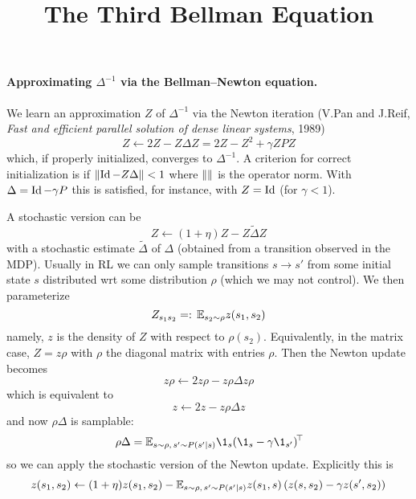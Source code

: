 \documentclass[11pt,a4paper]{article}
\title{The Third Bellman Equation}
\author{}
\begin{document}
\maketitle

\paragraph{Approximating $\Delta^{-1}$ via the Bellman--Newton equation.}
We learn an approximation $Z$ of $\Delta^{-1}$ via the Newton iteration
(V.Pan and J.Reif, \emph{Fast and efficient parallel solution of dense
linear systems}, 1989)
\begin{equation}
Z\gets 2Z-Z\Delta Z=2Z-Z^2+\gamma ZPZ
\end{equation}
which, if properly initialized, converges to $\Delta^{-1}$. A criterion
for correct initialization is if $\left\lVert\operatorname{Id}-Z\Delta\right\rVert<1$ where $\left\lVert\right\rVert$
is the operator norm. With $\Delta=\operatorname{Id}-\gamma P$ this is satisfied, for
instance, with $Z=\operatorname{Id}$ (for $\gamma<1$).

A stochastic version can be
\begin{equation}
Z\gets (1+\eta) Z-Z\tilde \Delta Z
\end{equation}
with a stochastic estimate $\tilde \Delta$ of $\Delta$ (obtained from a
transition observed in the MDP). Usually in RL we can only sample
transitions $s\to s'$ from some initial state $s$ distributed wrt some
distribution $\rho$ (which we may not control). We then parameterize
\begin{equation}
Z_{s_1s_2}=\mathrel{\mathop{:}} \,\mathbb{E}_{s_2\sim \rho} z(s_1,s_2)
\end{equation}
namely, $z$ is the density of $Z$ with respect to $\rho(s_2)$.
Equivalently, in the matrix case, $Z=z\rho$ with $\rho$ the diagonal
matrix with entries $\rho$. Then the Newton update becomes
\begin{equation}
z\rho\gets 2z\rho-z\rho\Delta z\rho
\end{equation}
which is equivalent to
\begin{equation}
z\gets 2z-z\rho\Delta z
\end{equation}
and now $\rho \Delta$ is samplable:
\begin{equation}
\rho\Delta=\E_{s\sim \rho,\,s'\sim P(s'|s)}
\1_s\transp{(\1_s-\gamma\1_{s'})}
\end{equation}
so we can apply the stochastic version of the Newton update. Explicitly
this is
\begin{equation}
z(s_1,s_2)\gets (1+\eta) z(s_1,s_2)-
\mathbb{E}_{s\sim \rho,\,s'\sim P(s'|s)}z(s_1,s)\left(z(s,s_2)-\gamma
z(s',s_2)\right)
\end{equation}
\end{document}
